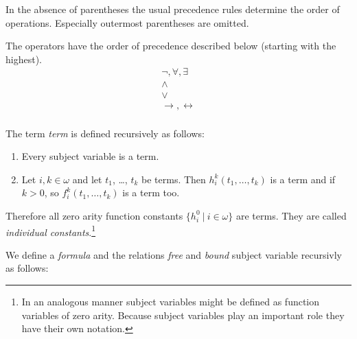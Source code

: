 \documentclass[a4paper,german,10pt,twoside]{book}
\theoremstyle{definition}
\theoremstyle{remark}
\begin{document}
In the absence of parentheses the usual precedence rules determine the order of operations.
Especially outermost parentheses are omitted.

\par
The operators have the order of precedence described below (starting with the highest).
$$
\begin{array}{c}
  \neg, \forall, \exists  \\
  \land \\
  \lor \\
  \rightarrow, \leftrightarrow \\
\end{array}
$$

\par
The term \emph{term} is defined recursively as follows:

\begin{enumerate}
\item Every subject variable is a term. 
\item Let $i, k \in \omega$ 
and let $t_1$, \ldots, $t_k$ be terms. Then $h^k_i(t_1, \ldots, t_k)$ is a term
and if $k > 0$, so $f^k_i(t_1, \ldots, t_k)$ is a term too.
\end{enumerate}

Therefore all zero arity function constants $\{h^0_i~|~i \in \omega\}$ are terms. They are called \emph{individual constants}.\footnote{In an analogous manner subject variables might be defined as function variables of zero arity. Because subject variables play an important role they have their own notation.}

\par
We define a \emph{formula} and the relations \emph{free} and \emph{bound} subject variable recursivly as follows:
\end{document}
